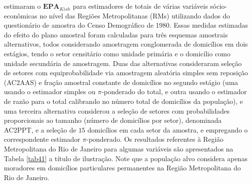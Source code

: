 \documentclass[]{book}
\numberwithin{example}{chapter}
\numberwithin{remark}{chapter}
\numberwithin{definition}{chapter}
\begin{document}
\citep{SilvaMou} estimaram o \(\mathbf{EPA}_{Kish}\) para estimadores de
totais de várias variáveis sócio-econômicas no nível das Regiões
Metropolitanas (RMs) utilizando dados do questionário de amostra do
Censo Demográfico de 1980. Essas medidas estimadas do efeito do plano
amostral foram calculadas para três esquemas amostrais alternativos,
todos considerando amostragem conglomerada de domicílios em dois
estágios, tendo o setor censitário como unidade primária e o domicílio
como unidade secundária de amostragem. Duas das alternativas
consideraram seleção de setores com equiprobabilidade via amostragem
aleatória simples sem reposição (AC2AAS) e fração amostral constante de
domicílios no segundo estágio (uma usando o estimador simples ou
\(\pi\)-ponderado do total, e outra usando o estimador de razão para o
total calibrando no número total de domicílios da população), e uma
terceira alternativa considerou a seleção de setores com probabilidades
proporcionais ao tamanho (número de domicílios por setor), denominada
AC2PPT, e a seleção de \(15\) domicílios em cada setor da amostra, e
empregando o correspondente estimador \(\pi\)-ponderado. Os resultados
referentes à Região Metropolitana do Rio de Janeiro para algumas
variáveis são apresentados na Tabela \ref{tab41} a título de ilustração.
Note que a população alvo considera apenas moradores em domicílios
particulares permanentes na Região Metropolitana do Rio de Janeiro.
\end{document}
